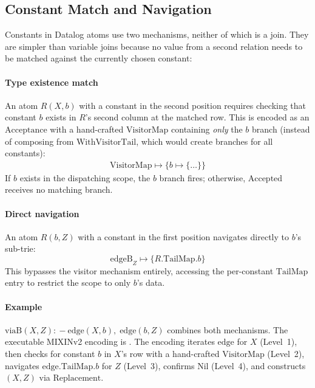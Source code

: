 \subsection{Constant Match and Navigation}
\label{sec:encoding-constants}

Constants in Datalog atoms use two mechanisms, neither of
which is a join.
They are simpler than variable joins because no value from a
second relation needs to be matched against the currently chosen
constant:

\paragraph{Type existence match}
An atom $R(X, b)$ with a constant in the second position
requires checking that constant $b$ exists in $R$'s
second column at the matched row.
This is encoded as an $\mathrm{Acceptance}$ with a
hand-crafted $\mathrm{VisitorMap}$ containing \emph{only}
the $b$ branch (instead of composing from
  $\mathrm{WithVisitorTail}$, which would create branches for
all constants):
{\small
  \begin{align*}
    \mathrm{VisitorMap} \mapsto \{b \mapsto \{\ldots\}\}
\end{align*}}
If $b$ exists in the dispatching scope, the
$b$ branch fires; otherwise, $\mathrm{Accepted}$
receives no matching branch.

\paragraph{Direct navigation}
An atom $R(b, Z)$ with a constant in the first position
navigates directly to $b$'s sub-trie:
\[
  \mathrm{edgeB}_Z \mapsto \{R.\mathrm{TailMap}.b\}
\]
This bypasses the visitor mechanism entirely, accessing
the per-constant $\mathrm{TailMap}$ entry to restrict the
scope to only $b$'s data.

\paragraph{Example}
$\mathrm{viaB}(X, Z) \mathrel{{:}\!{-}} \mathrm{edge}(X, b),\; \mathrm{edge}(b, Z)$
combines both mechanisms.
The executable MIXINv2 encoding is
.
The encoding iterates $\mathrm{edge}$ for $X$ (Level~1),
then checks for constant $b$ in $X$'s row with a
hand-crafted $\mathrm{VisitorMap}$ (Level~2), navigates
$\mathrm{edge}.\mathrm{TailMap}.b$ for $Z$ (Level~3),
confirms $\mathrm{Nil}$ (Level~4), and constructs $(X, Z)$
via $\mathrm{Replacement}$.

